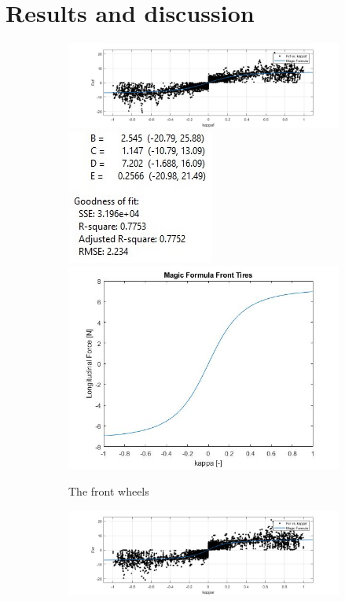 \section{Results and discussion}

\begin{figure}
	\centering
	\begin{subfigure}{1\linewidth}
		\includegraphics[scale=0.52]{figure/MagicFormulaFrontBags}
		\includegraphics[scale=1.1]{figure/MagicFormulaFrontBagsFitnumbers}
		\includegraphics[scale=0.4]{figure/MagicFormulaFrontBagsPic}
        \caption{The front wheels}
    \label{fig:mffront}
\end{subfigure}
	\begin{subfigure}{1\linewidth}
		\includegraphics[scale=0.52]{figure/MagicFormulaRearBags}

\end{subfigure}
\end{figure}
